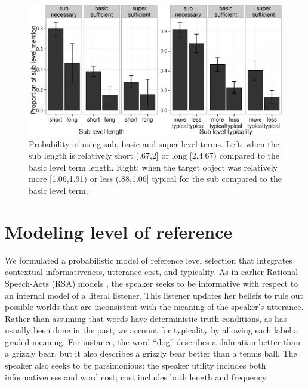 \documentclass[10pt,letterpaper]{article}
\begin{document}


\begin{figure}[bt]
\centering
\includegraphics[width=.5\textwidth]{graphs/length-typicality}
\caption{Probability of using sub, basic and super level terms. Left: when the sub  length is relatively short (.67,2] or long [2,4.67) compared to the basic level term length. Right: when the target object was relatively more [1.06,1.91) or less (.88,1.06] typical for the sub compared to the basic level term.}
 \label{fig:lengthtypicality}
\end{figure}


\section{\bf Modeling level of reference}

We formulated a probabilistic model of reference level selection that integrates contextual informativeness, utterance cost, and typicality.
As in earlier Rational Speech-Acts (RSA) models \cite{frank2012, goodmanstuhlmueller2013}, the speaker seeks to be informative with respect to an internal model of a literal listener. This listener updates her beliefs to rule out possible worlds that are inconsistent with the meaning of the speaker's utterance. Rather than assuming that words have deterministic truth conditions, as has usually been done in the past, we account for typicality by allowing each label a graded meaning. For instance, the word ``dog'' describes a dalmatian better than a grizzly bear, but it also describes a grizzly bear better than a tennis ball.
The speaker also seeks to be parsimonious: the speaker utility includes both informativeness and word cost; cost includes both length and frequency.
\end{document}
